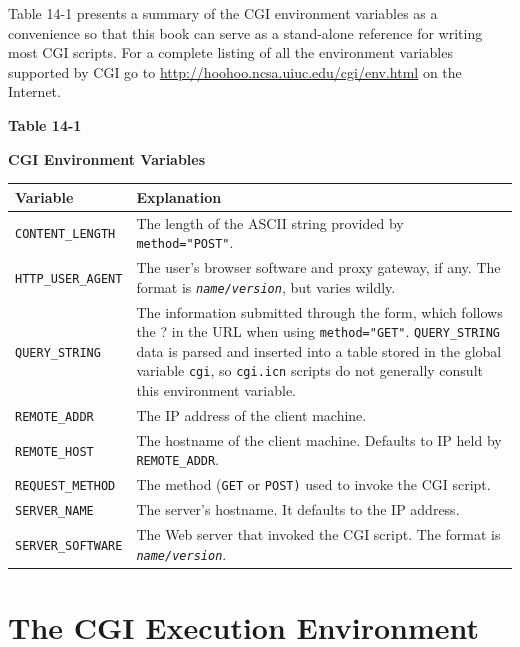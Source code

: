 {

Table 14-1 presents a summary of the CGI environment variables as a
convenience so that this book can serve as a stand-alone reference for
writing most CGI scripts. For a complete listing of all the environment
variables supported by CGI go to
\url{http://hoohoo.ncsa.uiuc.edu/cgi/env.html} on the Internet.

{\centering\sffamily\bfseries Table 14-1}

{\centering\sffamily\bfseries CGI Environment Variables}

\begin{flushleft}
\tablehead{}
\begin{supertabular}{|m{1.65in}|m{4.15in}|}
\hline
\sffamily\bfseries Variable &
\sffamily\bfseries Explanation\\\hline
\texttt{CONTENT\_LENGTH} &
The length of the ASCII string provided by
\texttt{method="POST"}.\\\hline
\texttt{HTTP\_USER\_AGENT} &
The user's browser software and proxy gateway, if any.
The format is \texttt{\textit{name/version}}, but varies
wildly.\\\hline
\texttt{QUERY\_STRING} &
The information submitted through the form, which follows the ? in the
URL when using \texttt{method="GET"}.
\texttt{QUERY\_STRING} data is parsed and inserted into a table
stored in the global variable \texttt{cgi}, so
\texttt{cgi.icn} scripts do not generally consult this environment
variable.\\\hline
\texttt{REMOTE\_ADDR} &
The IP address of the client machine.\\\hline
\texttt{REMOTE\_HOST} &
The hostname of the client machine. Defaults to IP held by
\texttt{REMOTE\_ADDR}.\\\hline
\texttt{REQUEST\_METHOD} &
The method (\texttt{GET} or \texttt{POST)} used to invoke the CGI
script.\\\hline
\texttt{SERVER\_NAME} &
The server's hostname. It defaults to the IP
address.\\\hline
\texttt{SERVER\_SOFTWARE} &
The Web server that invoked the CGI script. The format is
\texttt{\textit{name/version}}.\\\hline
\end{supertabular}
\end{flushleft}

\section{The CGI Execution Environment}

}
